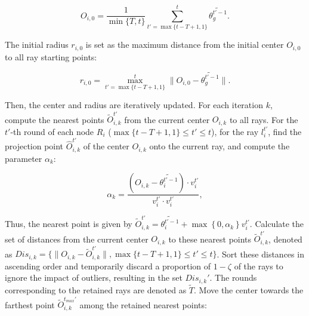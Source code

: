 \documentclass[lettersize,journal]{IEEEtran}
\begin{document}
\begin{equation}
    O_{i,0} = \frac{1}{\min\{T, t\}} \sum_{t'=\max\{t-T+1, 1\}}^{t} \widetilde{\theta_g^{t'-1}}.
\end{equation}

The initial radius \( r_{i,0} \) is set as the maximum distance from the initial center \( O_{i,0} \) to all ray starting points:

\begin{equation}
r_{i,0} = \max_{t'=\max\{t-T+1, 1\}}^{t}  \|O_{i,0} - \widetilde{\theta_{g}^{t'-1}}\|.
\end{equation}

Then, the center and radius are iteratively updated. 
For each iteration \( k \), compute the nearest points \( \tilde{O}_{i,k}^{t'} \) from the current center \( O_{i,k} \) to all rays. For the $t'$-th round of each node $R_i$ (\(\max\{t-T+1, 1\}\leq  t'\leq t\)), for the ray \( l_i^{t'} \), find the projection point \( \hat O_{i,k}^{t'} \) of the center \( O_{i,k} \) onto the current ray, and compute the parameter \( \alpha_k \):

\begin{equation}
\alpha_k = \frac{(O_{i,k} - \widetilde{\theta_{i}^{t'-1}}) \cdot {v}_{i}^{t'}}{{v}_{i}^{t'}\cdot {v}_{i}^{t'}},
\end{equation}

Thus, the nearest point is given by \( \tilde O_{i,k}^{t'} =\widetilde{\theta_{i}^{t'-1}}+\max \left\{ 0, \alpha_k\right\} {v}_{i}^{t'} \). 
Calculate the set of distances from the current center \( O_{i,k} \) to these nearest points \( \tilde O_{i,k}^{t'} \), denoted as \( Dis_{i,k}= \{ \| O_{i,k}-\tilde O_{i,k}^{t'} \|, \max\{t-T+1, 1\}\leq  t'\leq t\} \). Sort these distances in ascending order and temporarily discard a proportion of \(1-\zeta\) of the rays to ignore the impact of outliers, resulting in the set ${Dis}_{i,k}'$. The rounds corresponding to the retained rays are denoted as $\tilde T$. Move the center towards the farthest point $\tilde{O}_{i,k}^{t_{max}'}$ among the retained nearest points:
\end{document}
